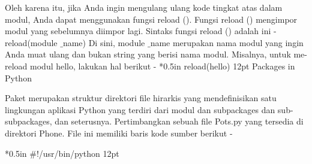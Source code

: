 Oleh karena itu, jika Anda ingin mengulang ulang kode tingkat atas dalam modul, Anda dapat menggunakan fungsi reload (). Fungsi reload () mengimpor modul yang sebelumnya diimpor lagi. Sintaks fungsi reload () adalah ini - 
 \hspace*{0.5in} reload(module $  \_  $name)
Di sini, module $  \_  $name merupakan nama modul yang ingin Anda muat ulang dan bukan string yang berisi nama modul. Misalnya, untuk me-reload modul hello, lakukan hal berikut - 
 *{0.5in} reload(hello)
{12pt}
\noindent 
Packages in Python 

Paket merupakan struktur direktori file hirarkis yang mendefinisikan satu lingkungan aplikasi Python yang terdiri dari modul dan subpackages dan sub-subpackages, dan seterusnya.
Pertimbangkan sebuah file Pots.py yang tersedia di direktori Phone. File ini memiliki baris kode sumber berikut -

 *{0.5in}  $  \#  $!/usr/bin/python {12pt}

